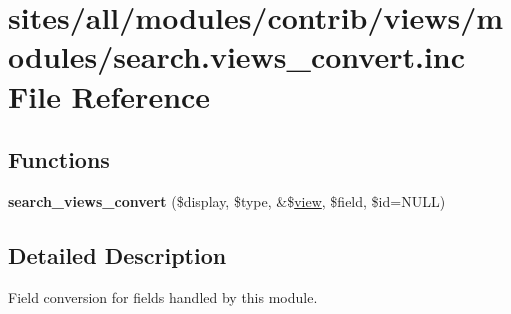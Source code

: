 \hypertarget{search_8views__convert_8inc}{
\section{sites/all/modules/contrib/views/modules/search.views\_\-convert.inc File Reference}
\label{search_8views__convert_8inc}
}
\subsection*{Functions}
\begin{CompactItemize}
\item 
\hypertarget{search_8views__convert_8inc_c71ca682d48e6b081a47b40c31217404}{
\textbf{search\_\-views\_\-convert} (\$display, \$type, \&\$\hyperlink{classview}{view}, \$field, \$id=NULL)}
\label{search_8views__convert_8inc_c71ca682d48e6b081a47b40c31217404}

\end{CompactItemize}


\subsection{Detailed Description}
Field conversion for fields handled by this module. 